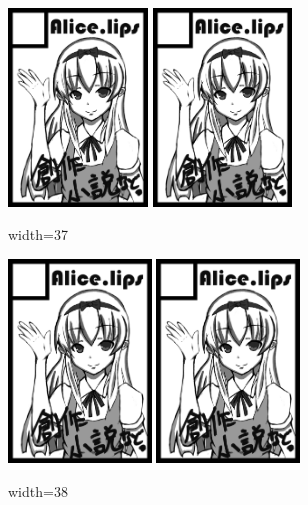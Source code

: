 \documentclass[a4paper]{jarticle}
\begin{document}
\begin{figure}
  \includegraphics[width=37mm,bb=0 0 600 853]{origin.png}
  \hfill
  \includegraphics[width=37mm,bb=0 0 600 853]{origin.png}
  \caption{width=37}
\end{figure}

\begin{figure}
  \includegraphics[width=38mm,bb=0 0 600 853]{origin.png}
  \hfill
  \includegraphics[width=38mm,bb=0 0 600 853]{origin.png}
  \caption{width=38}
\end{figure}
\end{document}

